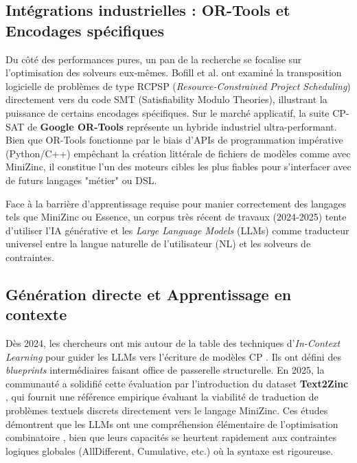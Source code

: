 \subsection{Intégrations industrielles : OR-Tools et Encodages spécifiques}
Du côté des performances pures, un pan de la recherche se focalise sur l'optimisation des solveurs eux-mêmes. Bofill et al. \cite{bofill2020smt} ont examiné la transposition logicielle de problèmes de type RCPSP (\textit{Resource-Constrained Project Scheduling}) directement vers du code SMT (Satisfiability Modulo Theories), illustrant la puissance de certains encodages spécifiques. 
Sur le marché applicatif, la suite CP-SAT de \textbf{Google OR-Tools} \cite{ortools2024} représente un hybride industriel ultra-performant. Bien que OR-Tools fonctionne par le biais d'APIs de programmation impérative (Python/C++) empêchant la création littérale de fichiers de modèles comme avec MiniZinc, il constitue l'un des moteurs cibles les plus fiables pour s'interfacer avec de futurs langages "métier" ou DSL.


Face à la barrière d'apprentissage requise pour manier correctement des langages tels que MiniZinc ou Essence, un corpus très récent de travaux (2024-2025) tente d'utiliser l'IA générative et les \textit{Large Language Models} (LLMs) comme traducteur universel entre la langue naturelle de l'utilisateur (NL) et les solveurs de contraintes.

\subsection{Génération directe et Apprentissage en contexte}
Dès 2024, les chercheurs ont mis autour de la table des techniques d'\textit{In-Context Learning} pour guider les LLMs vers l'écriture de modèles CP \cite{constraintllmicl2024}. Ils ont défini des \textit{blueprints} intermédiaires faisant office de passerelle structurelle. En 2025, la communauté a solidifié cette évaluation par l'introduction du dataset \textbf{Text2Zinc} \cite{text2zinc2025}, qui fournit une référence empirique évaluant la viabilité de traduction de problèmes textuels discrets directement vers le langage MiniZinc. Ces études démontrent que les LLMs ont une compréhension élémentaire de l'optimisation combinatoire \cite{acmg2025}, bien que leurs capacités se heurtent rapidement aux contraintes logiques globales (AllDifferent, Cumulative, etc.) où la syntaxe est rigoureuse. 

